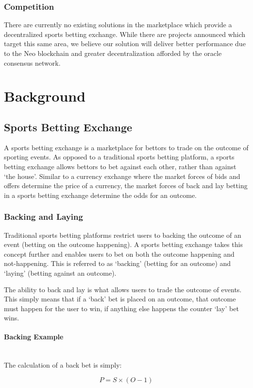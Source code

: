 \documentclass{article}
\newcommand{\myparagraph}[1]{\paragraph{#1}\mbox{}\\ \newline}
\begin{document}
		\subsubsection{Competition}
There are currently no existing solutions in the marketplace which provide a decentralized sports betting exchange. While there are projects announced which target this same area, we believe our solution will deliver better performance due to the Neo blockchain and greater decentralization afforded by the oracle consensus network.

\pagebreak

\section{Background}

	\subsection{Sports Betting Exchange}
A sports betting exchange is a marketplace for bettors to trade on the outcome of sporting events. As opposed to a traditional sports betting platform, a sports betting exchange allows bettors to bet against each other, rather than against ‘the house’. Similar to a currency exchange where the market forces of bids and offers determine the price of a currency, the market forces of back and lay betting in a sports betting exchange determine the odds for an outcome.

		\subsubsection{Backing and Laying}
Traditional sports betting platforms restrict users to backing the outcome of an event (betting on the outcome happening). A sports betting exchange takes this concept further and enables users to bet on both the outcome happening and not-happening. This is referred to as ‘backing’ (betting for an outcome) and ‘laying’ (betting against an outcome). 

The ability to back and lay is what allows users to trade the outcome of events. This simply means that if a ‘back’ bet is placed on an outcome, that outcome must happen for the user to win, if anything else happens the counter ‘lay’ bet wins.

				\myparagraph{Backing Example}
\medskip 
The calculation of a back bet is simply:  

\begin{equation}
P = S\times(O - 1)\label{eq:backing}
\end{equation}
\end{document}
